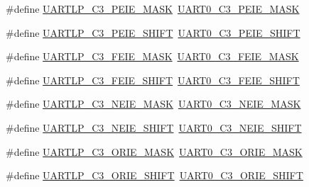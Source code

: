 \begin{DoxyCompactItemize}
\item 
\#define \hyperlink{group___backward___compatibility___symbols_ga4cc8bfb380818563bdfa2f98fbde7710}{U\+A\+R\+T\+L\+P\+\_\+\+C3\+\_\+\+P\+E\+I\+E\+\_\+\+M\+A\+SK}~\hyperlink{group___u_a_r_t0___register___masks_ga756c38b1457b21e8bc4c364f890b7390}{U\+A\+R\+T0\+\_\+\+C3\+\_\+\+P\+E\+I\+E\+\_\+\+M\+A\+SK}
\item 
\#define \hyperlink{group___backward___compatibility___symbols_gacaf37722e62340c548104406df0bcc64}{U\+A\+R\+T\+L\+P\+\_\+\+C3\+\_\+\+P\+E\+I\+E\+\_\+\+S\+H\+I\+FT}~\hyperlink{group___u_a_r_t0___register___masks_gafce96820de4fce25539d9bc3f0bee376}{U\+A\+R\+T0\+\_\+\+C3\+\_\+\+P\+E\+I\+E\+\_\+\+S\+H\+I\+FT}
\item 
\#define \hyperlink{group___backward___compatibility___symbols_ga06e90c952858ab6b2a6e8fec451fed4a}{U\+A\+R\+T\+L\+P\+\_\+\+C3\+\_\+\+F\+E\+I\+E\+\_\+\+M\+A\+SK}~\hyperlink{group___u_a_r_t0___register___masks_gaa01da5d1e8dc6f89dc58c0104beba4b2}{U\+A\+R\+T0\+\_\+\+C3\+\_\+\+F\+E\+I\+E\+\_\+\+M\+A\+SK}
\item 
\#define \hyperlink{group___backward___compatibility___symbols_ga47332e2095915eede18d8b2e44bc08d3}{U\+A\+R\+T\+L\+P\+\_\+\+C3\+\_\+\+F\+E\+I\+E\+\_\+\+S\+H\+I\+FT}~\hyperlink{group___u_a_r_t0___register___masks_gaafe99b12e9534395e8c36a86dd3d2e98}{U\+A\+R\+T0\+\_\+\+C3\+\_\+\+F\+E\+I\+E\+\_\+\+S\+H\+I\+FT}
\item 
\#define \hyperlink{group___backward___compatibility___symbols_ga5b1c0f5de0179b86f7efd474133a5838}{U\+A\+R\+T\+L\+P\+\_\+\+C3\+\_\+\+N\+E\+I\+E\+\_\+\+M\+A\+SK}~\hyperlink{group___u_a_r_t0___register___masks_ga44fe8fd48c0fac9eda6b76bba6174f45}{U\+A\+R\+T0\+\_\+\+C3\+\_\+\+N\+E\+I\+E\+\_\+\+M\+A\+SK}
\item 
\#define \hyperlink{group___backward___compatibility___symbols_gaa8aa79a21c751f77d27f76e62753bf9f}{U\+A\+R\+T\+L\+P\+\_\+\+C3\+\_\+\+N\+E\+I\+E\+\_\+\+S\+H\+I\+FT}~\hyperlink{group___u_a_r_t0___register___masks_ga60c064efad2eef2bc2ebebe2c0ffd1b9}{U\+A\+R\+T0\+\_\+\+C3\+\_\+\+N\+E\+I\+E\+\_\+\+S\+H\+I\+FT}
\item 
\#define \hyperlink{group___backward___compatibility___symbols_gaa9293d3cac47a88e5be264b21e110bfd}{U\+A\+R\+T\+L\+P\+\_\+\+C3\+\_\+\+O\+R\+I\+E\+\_\+\+M\+A\+SK}~\hyperlink{group___u_a_r_t0___register___masks_ga728e7b520b1f4122c701a1fec02dce60}{U\+A\+R\+T0\+\_\+\+C3\+\_\+\+O\+R\+I\+E\+\_\+\+M\+A\+SK}
\item 
\#define \hyperlink{group___backward___compatibility___symbols_gad69f41c3e7e8bd2086748eb86a967220}{U\+A\+R\+T\+L\+P\+\_\+\+C3\+\_\+\+O\+R\+I\+E\+\_\+\+S\+H\+I\+FT}~\hyperlink{group___u_a_r_t0___register___masks_ga01878e41bfd1652bb4c6e4a27a11dd68}{U\+A\+R\+T0\+\_\+\+C3\+\_\+\+O\+R\+I\+E\+\_\+\+S\+H\+I\+FT}

\end{DoxyCompactItemize}
